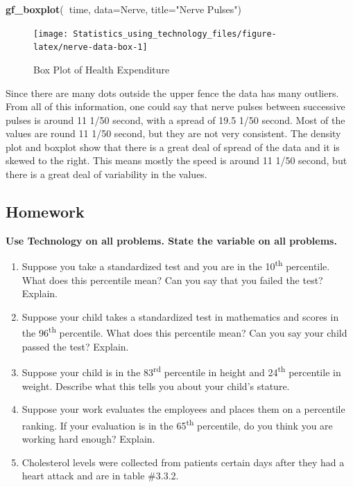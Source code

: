 \documentclass[
]{book}
\newenvironment{Shaded}{\begin{snugshade}}{\end{snugshade}}
\newcommand{\DataTypeTok}[1]{\textcolor[rgb]{0.13,0.29,0.53}{#1}}
\newcommand{\KeywordTok}[1]{\textcolor[rgb]{0.13,0.29,0.53}{\textbf{#1}}}
\newcommand{\NormalTok}[1]{#1}
\newcommand{\OperatorTok}[1]{\textcolor[rgb]{0.81,0.36,0.00}{\textbf{#1}}}
\newcommand{\StringTok}[1]{\textcolor[rgb]{0.31,0.60,0.02}{#1}}
\begin{document}
\begin{Shaded}
\begin{Highlighting}[]
\KeywordTok{gf_boxplot}\NormalTok{(}\OperatorTok{~}\NormalTok{time, }\DataTypeTok{data=}\NormalTok{Nerve, }\DataTypeTok{title=}\StringTok{"Nerve Pulses"}\NormalTok{)}
\end{Highlighting}
\end{Shaded}

\begin{figure}
\texttt{[image: Statistics\_using\_technology\_files/figure-latex/nerve-data-box-1]} \caption{Box Plot of Health Expenditure}\label{fig:nerve-data-box}
\end{figure}

Since there are many dots outside the upper fence the data has many outliers. From all of this information, one could say that nerve pulses between successive pulses is around 11 1/50 second, with a spread of 19.5 1/50 second. Most of the values are round 11 1/50 second, but they are not very consistent. The density plot and boxplot show that there is a great deal of spread of the data and it is skewed to the right. This means mostly the speed is around 11 1/50 second, but there is a great deal of variability in the values.

\hypertarget{homework-5}{%
\subsection{Homework}\label{homework-5}}

\textbf{Use Technology on all problems. State the variable on all problems.}

\begin{enumerate}
\def\labelenumi{\arabic{enumi}.}
\item
  Suppose you take a standardized test and you are in the 10\textsuperscript{th} percentile. What does this percentile mean? Can you say that you failed the test? Explain.
\item
  Suppose your child takes a standardized test in mathematics and scores in the 96\textsuperscript{th} percentile. What does this percentile mean? Can you say your child passed the test? Explain.
\item
  Suppose your child is in the 83\textsuperscript{rd} percentile in height and 24\textsuperscript{th} percentile in weight. Describe what this tells you about your child's stature.
\item
  Suppose your work evaluates the employees and places them on a percentile ranking. If your evaluation is in the 65\textsuperscript{th} percentile, do you think you are working hard enough? Explain.
\item
  Cholesterol levels were collected from patients certain days after they had a heart attack and are in table \#3.3.2.
\end{enumerate}
\end{document}
